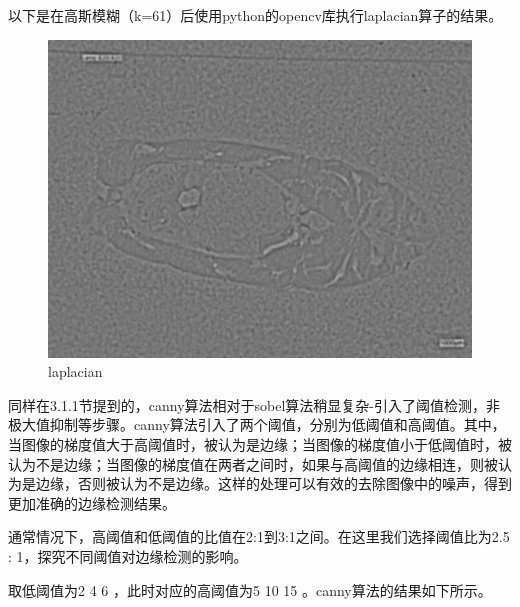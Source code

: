 以下是在高斯模糊（k=61）后使用python的opencv库执行laplacian算子的结果。

\begin{figure}[H]
    \centering
    \begin{minipage}{0.4\textwidth}
        \centering
        \includegraphics[width=\textwidth]{./fig/gausssian/laplacian61.jpg}
        \caption{laplacian}
        \label{fig:laplacian}
    \end{minipage}
\end{figure}

同样在3.1.1节提到的，canny算法相对于sobel算法稍显复杂-引入了阈值检测，非极大值抑制等步骤。canny算法引入了两个阈值，分别为低阈值和高阈值。其中，当图像的梯度值大于高阈值时，被认为是边缘；当图像的梯度值小于低阈值时，被认为不是边缘；当图像的梯度值在两者之间时，如果与高阈值的边缘相连，则被认为是边缘，否则被认为不是边缘。这样的处理可以有效的去除图像中的噪声，得到更加准确的边缘检测结果。

通常情况下，高阈值和低阈值的比值在2:1到3:1之间。在这里我们选择阈值比为2.5 : 1，探究不同阈值对边缘检测的影响。

取低阈值为2 4 6 ，此时对应的高阈值为5 10 15 。canny算法的结果如下所示。

